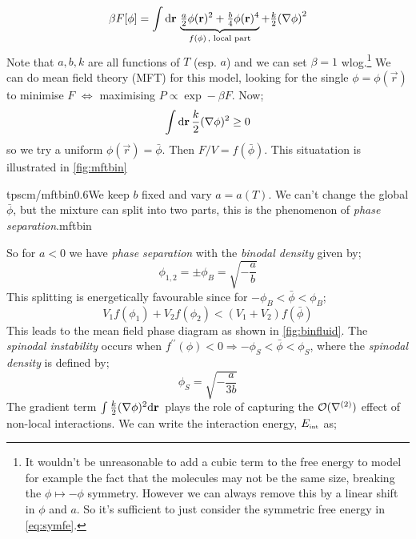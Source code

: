 \begin{equation}
\label{eq:symfe}
\beta F[\phi] = \int{\upd{\vec r}\underbrace{\tfrac{a}{2}\phi(\vec r)^2 + \tfrac{b}{4}\phi(\vec r)^4}_{f(\phi) \, \text{, local part}} + \tfrac{k}{2}\left(\nabla \phi\right)^2}
\end{equation}
Note that $a, b, k$ are all functions of $T$ (esp. $a$) and we can set $\beta = 1$ wlog.\footnote{It wouldn't be unreasonable to add a cubic term to the free energy to model for example the fact that the molecules may not be the same size, breaking the $\phi \mapsto -\phi$ symmetry. However we can always remove this by a linear shift in $\phi$ and $a$. So it's sufficient to just consider the symmetric free energy in \eqref{eq:symfe}.} We can do mean field theory (MFT) for this model, looking for the single $\phi = \phi(\vec r)$ to minimise $F$ $\iff$ maximising $P \propto \exp -\beta F$. Now;
\begin{equation*}
\int{\text{d}\mathbf r \, \frac{k}{2}(\nabla \phi)^2} \geq 0
\end{equation*}
so we try a uniform $\phi(\vec r) = \bar{\phi}$. Then $F/V = f(\bar{\phi})$. This situatation is illustrated in \autoref{fig:mftbin}
\begin{mygraphic}{tpscm/mftbin}{0.6}{We keep $b$ fixed and vary $a = a(T)$. We can't change the global $\bar{\phi}$, but the mixture can split into two parts, this is the phenomenon of \emph{phase separation}.}{mftbin}\end{mygraphic}
So for $a < 0$ we have \emph{phase separation} with the \emph{binodal density} given by;
\begin{equation}
\phi_{1,2} = \pm \phi_B = \sqrt{-\frac{a}{b}}
\end{equation}
This splitting is energetically favourable since for $-\phi_B < \bar{\phi} < \phi_B$;
\begin{equation}
V_1 f(\phi_1) + V_2 f(\phi_2) < (V_1 + V_2) f(\bar{\phi})
\end{equation}
This leads to the mean field phase diagram as shown in \autoref{fig:binfluid}. The \emph{spinodal instability} occurs when $f^{\prime \prime}(\phi) < 0 \Rightarrow -\phi_S < \bar{\phi} < \phi_S$, where the \emph{spinodal density} is defined by;
\begin{equation}
\phi_S = \sqrt{-\frac{a}{3b}}
\end{equation}
The gradient term $\int{\tfrac{k}{2}(\nabla \phi)^2 \text{d}\mathbf r \,}$ plays the role of capturing the $\mathcal{O}(\nabla^{(2)})$ effect of non-local interactions. We can write the interaction energy, $E_{\text{\tiny{int}}}$ as;
